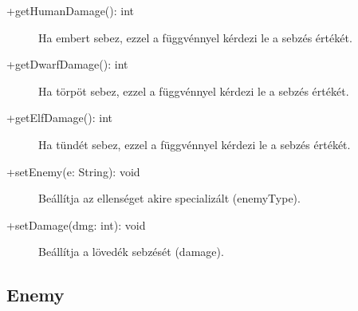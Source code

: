 \begin{itemize}
\begin{description}
\item[+getHumanDamage(): int] Ha embert sebez, ezzel a függvénnyel kérdezi le a sebzés értékét.
\item[+getDwarfDamage(): int] Ha törpöt sebez, ezzel a függvénnyel kérdezi le a sebzés értékét.
\item[+getElfDamage(): int] Ha tündét sebez, ezzel a függvénnyel kérdezi le a sebzés értékét.
\item[+setEnemy(e: String): void] Beállítja az ellenséget akire specializált (enemyType).
\item[+setDamage(dmg: int): void] Beállítja a lövedék sebzését (damage).

	\end{description}
\end{itemize}


\subsection{Enemy}
